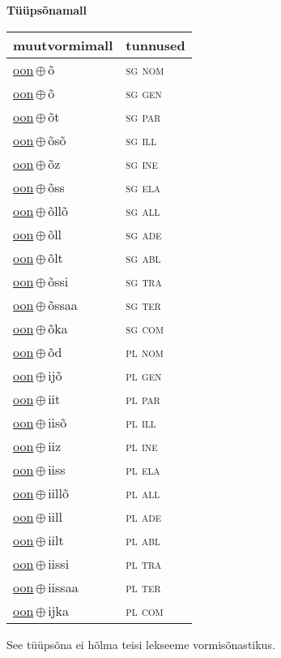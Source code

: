 

\vspace{3.5em}
\noindent \begin{minipage}{\textwidth}
\noindent \textbf{Tüüpsõnamall \,}\\

\begin{sideways}
\begin{tabular}{l l}
muutvormimall & tunnused \\
\hline
\underline{oon}\,$\oplus$\,õ & \textsc{ sg nom } \\
\underline{oon}\,$\oplus$\,õ & \textsc{ sg gen } \\
\underline{oon}\,$\oplus$\,õt & \textsc{ sg par } \\
\underline{oon}\,$\oplus$\,õsõ & \textsc{ sg ill } \\
\underline{oon}\,$\oplus$\,õz & \textsc{ sg ine } \\
\underline{oon}\,$\oplus$\,õss & \textsc{ sg ela } \\
\underline{oon}\,$\oplus$\,õllõ & \textsc{ sg all } \\
\underline{oon}\,$\oplus$\,õll & \textsc{ sg ade } \\
\underline{oon}\,$\oplus$\,õlt & \textsc{ sg abl } \\
\underline{oon}\,$\oplus$\,õssi & \textsc{ sg tra } \\
\underline{oon}\,$\oplus$\,õssaa & \textsc{ sg ter } \\
\underline{oon}\,$\oplus$\,õka & \textsc{ sg com } \\
\underline{oon}\,$\oplus$\,õd & \textsc{ pl nom } \\
\underline{oon}\,$\oplus$\,ijõ & \textsc{ pl gen } \\
\underline{oon}\,$\oplus$\,iit & \textsc{ pl par } \\
\underline{oon}\,$\oplus$\,iisõ & \textsc{ pl ill } \\
\underline{oon}\,$\oplus$\,iiz & \textsc{ pl ine } \\
\underline{oon}\,$\oplus$\,iiss & \textsc{ pl ela } \\
\underline{oon}\,$\oplus$\,iillõ & \textsc{ pl all } \\
\underline{oon}\,$\oplus$\,iill & \textsc{ pl ade } \\
\underline{oon}\,$\oplus$\,iilt & \textsc{ pl abl } \\
\underline{oon}\,$\oplus$\,iissi & \textsc{ pl tra } \\
\underline{oon}\,$\oplus$\,iissaa & \textsc{ pl ter } \\
\underline{oon}\,$\oplus$\,ijka & \textsc{ pl com } \\
\end{tabular}
\end{sideways}
\label{tab:tüüpsõnamall-oonõ}

\end{minipage}

 
\vspace{1em}
\noindent See tüüpsõna ei hõlma teisi lekseeme vormi\-sõnastikus.
